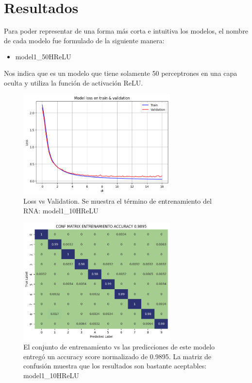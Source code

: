 \documentclass[journal]{IEEEtai}
\begin{document}
\section{Resultados}

Para poder representar de una forma más corta e intuitiva los modelos, el nombre de cada modelo fue formulado de la siguiente manera:

\begin{itemize}
\item	model1\_50HReLU 
\end{itemize}

Nos indica que es un modelo que tiene solamente 50 perceptrones en una capa oculta y utiliza la función de activación ReLU. 

\begin{figure}[H]
\centering
\includegraphics[width=8cm]{img/model10HReLU/lossvsval.png}
\caption{Loss vs Validation. Se muestra el término de entrenamiento del RNA: model1\_10HReLU}
\label{fig: model110HReLULOSSVSVAL}
\end{figure}

\begin{figure}[H]
\centering
\includegraphics[width=8cm]{img/model10HReLU/train.png}
\caption{El conjunto de entrenamiento vs las predicciones de este modelo entregó un accuracy score normalizado de  0.9895. La matriz de confusión muestra que los resultados son bastante aceptables: model1\_10HReLU}
\label{fig: model110HReLUTRAIN}
\end{figure}
\end{document}
